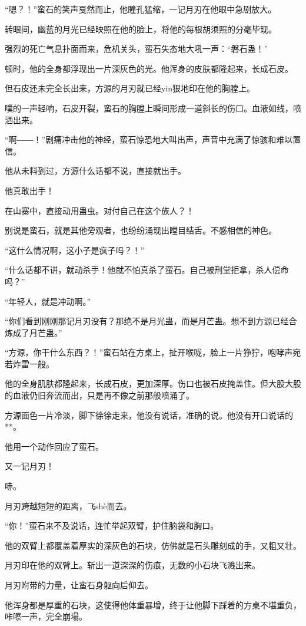 \begin{this_body}
“嗯？！”蛮石的笑声戛然而止，他瞳孔猛缩，一记月刃在他眼中急剧放大。

转眼间，幽蓝的月光已经映照在他的脸上，将他的每根胡须照的分毫毕现。

强烈的死亡气息扑面而来，危机关头，蛮石失态地大吼一声：“磐石蛊！”

顿时，他的全身都浮现出一片深灰色的光。他浑身的皮肤都隆起来，长成石皮。

但石皮还未完全长出来，方源的月刃就已经yin狠地印在他的胸膛上。

噗的一声轻响，石皮开裂，蛮石的胸膛上瞬间形成一道斜长的伤口。血液如线，喷洒出来。

“啊――！”剧痛冲击他的神经，蛮石惊恐地大叫出声，声音中充满了惊骇和难以置信。

他从未料到过，方源什么话都不说，直接就出手。

他真敢出手！

在山寨中，直接动用蛊虫。对付自己在这个族人？！

别说是蛮石，就是其他旁观者，也纷纷涌现出瞠目结舌。不感相信的神色。

“这什么情况啊，这小子是疯子吗？！”

“什么话都不讲，就动杀手！他就不怕真杀了蛮石。自己被刑堂拒拿，杀人偿命吗？”

“年轻人，就是冲动啊。”

“你们看到刚刚那记月刃没有？那绝不是月光蛊，而是月芒蛊。想不到方源已经合炼成了月芒蛊。”

“方源，你干什么东西？！”蛮石站在方桌上，扯开喉咙，脸上一片狰狞，咆哮声宛若炸雷一般。

他的全身肌肤都隆起来，长成石皮，更加深厚。伤口也被石皮掩盖住。但大股大股的血液仍旧奔流而出，只是再不像之前那般喷涌了。

方源面色一片冷淡，脚下徐徐走来，他没有说话，准确的说。他没有开口说话的**。

他用一个动作回应了蛮石。

又一记月刃！

哧。

月刃跨越短短的距离，飞shè而去。

“你！”蛮石来不及说话，连忙举起双臂，护住脑袋和胸口。

他的双臂上都覆盖着厚实的深灰色的石块，仿佛就是石头雕刻成的手，又粗又壮。

月刃印在他的双臂上。斩出一道深深的伤痕，无数的小石块飞溅出来。

月刃附带的力量，让蛮石身躯向后仰去。

他浑身都是厚重的石块，这使得他体重暴增，终于让他脚下踩着的方桌不堪重负，咔嚓一声，完全崩塌。


\end{this_body}
